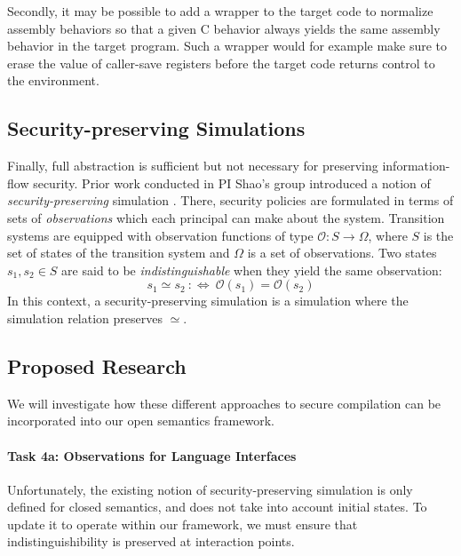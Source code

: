 Secondly,
it may be possible to add a wrapper to the target code
to normalize assembly behaviors
so that a given C behavior always yields
the same assembly behavior in the target program.
Such a wrapper would for example make sure
to erase the value of caller-save registers
before the target code returns control to the environment.

\subsection{Security-preserving Simulations}

Finally,
full abstraction is sufficient but not necessary
for preserving information-flow security.
Prior work conducted in PI Shao's group
introduced a notion of \emph{security-preserving} simulation
\cite{costanzo16}.
There,
security policies are formulated in terms
of sets of \emph{observations} 
which each principal can make about the system.
Transition systems are equipped with observation functions of type
$\mathcal{O} : S \rightarrow \Omega$,
where $S$ is the set of states of the transition system and
$\Omega$ is a set of observations.
Two states $s_1, s_2 \in S$
are said to be \emph{indistinguishable}
when they yield the same observation:
\[
  s_1 \simeq s_2 \::\Leftrightarrow\: \mathcal{O}(s_1) = \mathcal{O}(s_2)
\]
In this context,
a security-preserving simulation
is a simulation where
the simulation relation
preserves $\simeq$.

\subsection{Proposed Research}

We will investigate how these different approaches to secure compilation
can be incorporated into our open semantics framework.

\vspace*{-2ex}
\paragraph*{Task 4a: Observations for Language Interfaces}

Unfortunately,
the existing notion of security-preserving simulation
is only defined for closed semantics,
and does not take into account initial states.
To update it to operate within our framework,
we must ensure that indistinguishibility is preserved
at interaction points.

